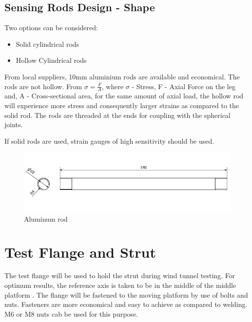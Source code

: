 \subsection{Sensing Rods Design - Shape}
Two options can be considered:
\begin{itemize}
\item Solid cylindrical rods
\item Hollow Cylindrical rods
\end{itemize}
From local suppliers, 10mm aluminium rods are available and economical. The rods are not hollow. From $\sigma = \frac{F}{A}$, where $\sigma$ - Stress, F - Axial Force on the leg and, A - Cross-sectional area, for the same amount of axial load, the hollow rod will experience more stress and consequently larger strains as compared to the solid rod. The rods are threaded at the ends for coupling with the spherical joints.

If solid rods are used, strain gauges of high sensitivity should be used.
\begin{center}
	\begin{figure}[!h]
	\centering
	\includegraphics[width=0.8\linewidth]{Figures/Rod}
	\caption[Aluminum rod]{Aluminum rod}
	\end{figure}
\end{center}

\section{Test Flange and Strut}
The test flange will be used to hold the strut during wind tunnel testing. For optimum results, the reference axis is taken to be in the middle of the middle platform \cite {fernandes_design_nodate}. The flange will be fastened to the moving platform by use of bolts and nuts. Fasteners are more economical and easy to achieve as compared to welding. M6 or M8 nuts cab be used for this purpose.

